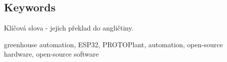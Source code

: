 \documentclass{template/socthesis}
\begin{document}
\subsection*{Keywords}
\color{mygreen}
Klíčová slova - jejich překlad do angličtiny.
\color{black}

greenhouse automation, ESP32, PROTOPlant, automation, open-source hardware, open-source software

\newpage
\pagestyle{plain}

\tableofcontents %

\setcounter{figure}{0}
\setcounter{table}{0}
\newpage



% 
















 

















\newpage



\appendix
{}






% 


% 


% 



\printbibliography[title=Literatura]


\listoffigures
{}

\listoftables
{}
\end{document}
